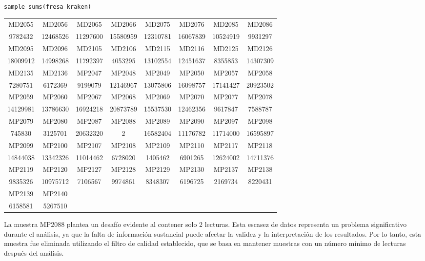 \begin{lstlisting}[basicstyle=\small] 
sample_sums(fresa_kraken)
\end{lstlisting}

\resizebox{0.9\textwidth}{!} {
\begin{tabular}{ c c c c c c c c }
MD2055 & MD2056 & MD2065 & MD2066 & MD2075 & MD2076 & MD2085 & MD2086 \\
9782432 & 12468526 & 11297600 & 15580959 & 12310781 & 16067839 & 10524919 & 9931297 \\
MD2095 & MD2096 & MD2105 & MD2106 & MD2115 & MD2116 & MD2125 & MD2126 \\
18009912 & 14998268 & 11792397 & 4053295 & 13102554 & 12451637 & 8355853 & 14307309 \\
MD2135 & MD2136 & MP2047 & MP2048 & MP2049 & MP2050 & MP2057 & MP2058 \\
7280751 & 6172369 & 9199079 & 12146967 & 13075806 & 16098757 & 17141427 & 20923502 \\
MP2059 & MP2060 & MP2067 & MP2068 & MP2069 & MP2070 & MP2077 & MP2078 \\
14129981 & 13786630 & 16924218 & 20873789 & 15537530 & 12462356 & 9617847 & 7588787 \\
MP2079 & MP2080 & MP2087 & MP2088 & MP2089 & MP2090 & MP2097 & MP2098 \\
745830 & 3125701 & 20632320 & 2 & 16582404 & 11176782 & 11714000 & 16595897 \\
MP2099 & MP2100 & MP2107 & MP2108 & MP2109 & MP2110 & MP2117 & MP2118 \\
14844038 & 13342326 & 11014462 & 6728020 & 1405462 & 6901265 & 12624002 & 14711376 \\
MP2119 & MP2120 & MP2127 & MP2128 & MP2129 & MP2130 & MP2137 & MP2138 \\
9835326 & 10975712 & 7106567 & 9974861 & 8348307 & 6196725 & 2169734 & 8220431 \\
MP2139 & MP2140 \\
6158581 & 5267510
\end{tabular}
}

La muestra MP2088 plantea un desafío evidente al contener solo 2 lecturas. Esta escasez de datos representa un problema significativo durante el análisis, ya que la falta de información sustancial puede afectar la validez y la interpretación de los resultados. Por lo tanto, esta muestra fue eliminada utilizando el filtro de calidad establecido, que se basa en mantener muestras con un número mínimo de lecturas después del análisis.\\

